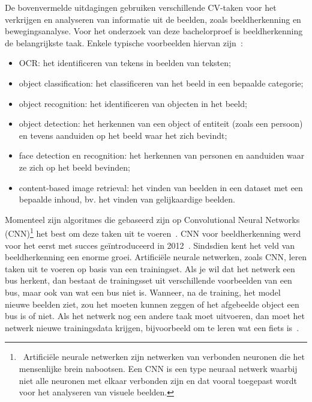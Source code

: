 De bovenvermelde uitdagingen gebruiken verschillende CV-taken voor het verkrijgen en analyseren van informatie uit de beelden, zoals beeldherkenning en bewegingsanalyse. Voor het onderzoek van deze bachelorproef is beeldherkenning de belangrijkste taak. Enkele typische voorbeelden hiervan zijn~\autocite{wikiCV}:
\begin{itemize}
	\item OCR: het identificeren van tekens in beelden van teksten;
	\item object classification: het classificeren van het beeld in een bepaalde categorie;
	\item object recognition: het identificeren van objecten in het beeld;
	\item object detection: het herkennen van een object of entiteit (zoals een persoon) en tevens aanduiden op het beeld waar het zich bevindt;
	\item face detection en recognition: het herkennen van personen en aanduiden waar ze zich op het beeld bevinden;
	\item content-based image retrieval: het vinden van beelden in een dataset met een bepaalde inhoud, bv. het vinden van gelijkaardige beelden.
\end{itemize}


Momenteel zijn algoritmes die gebaseerd zijn op Convolutional Neural Networks (CNN)\footnote{~Artificiële neurale netwerken zijn netwerken van verbonden neuronen die het mensenlijke brein nabootsen. Een CNN is een type neuraal netwerk waarbij niet alle neuronen met elkaar verbonden zijn en dat vooral toegepast wordt voor het analyseren van visuele beelden.} het best om deze taken uit te voeren~\autocites{Vu2018}{Stewart2019}. CNN voor beeldherkenning werd voor het eerst met succes geïntroduceerd in 2012~\autocite{Raval2017}. Sindsdien kent het veld van beeldherkenning een enorme groei. Artifici\"{e}le neurale netwerken, zoals CNN, leren taken uit te voeren op basis van een trainingset. Als je wil dat het netwerk een bus herkent, dan bestaat de trainingsset uit verschillende voorbeelden van een bus, maar ook van wat een bus niet is. Wanneer, na de training, het model nieuwe beelden ziet, zou het moeten kunnen zeggen of het afgebeelde object een bus is of niet. Als het netwerk nog een andere taak moet uitvoeren, dan moet het netwerk nieuwe trainingsdata krijgen, bijvoorbeeld om te leren wat een fiets is~\autocite{Pokharna2016}. 

